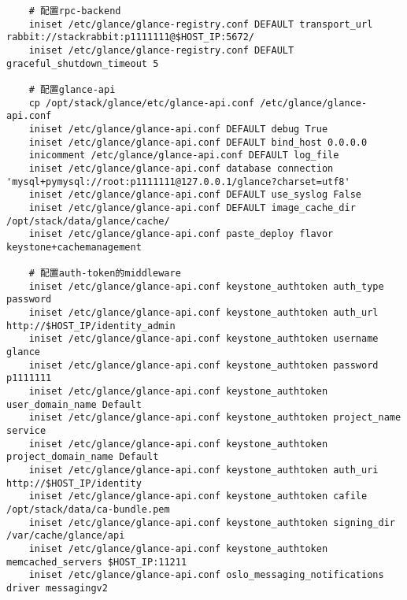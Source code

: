 \documentclass[a4paper,left=1.5cm,right=1.5cm,11pt]{article}
\begin{document}
\begin{lstlisting}
	# 配置rpc-backend
	iniset /etc/glance/glance-registry.conf DEFAULT transport_url rabbit://stackrabbit:p1111111@$HOST_IP:5672/
	iniset /etc/glance/glance-registry.conf DEFAULT graceful_shutdown_timeout 5

	# 配置glance-api
    cp /opt/stack/glance/etc/glance-api.conf /etc/glance/glance-api.conf
    iniset /etc/glance/glance-api.conf DEFAULT debug True
    iniset /etc/glance/glance-api.conf DEFAULT bind_host 0.0.0.0
    inicomment /etc/glance/glance-api.conf DEFAULT log_file
    iniset /etc/glance/glance-api.conf database connection 'mysql+pymysql://root:p1111111@127.0.0.1/glance?charset=utf8'
    iniset /etc/glance/glance-api.conf DEFAULT use_syslog False
    iniset /etc/glance/glance-api.conf DEFAULT image_cache_dir /opt/stack/data/glance/cache/
    iniset /etc/glance/glance-api.conf paste_deploy flavor keystone+cachemanagement
	
	# 配置auth-token的middleware
	iniset /etc/glance/glance-api.conf keystone_authtoken auth_type password
    iniset /etc/glance/glance-api.conf keystone_authtoken auth_url http://$HOST_IP/identity_admin
    iniset /etc/glance/glance-api.conf keystone_authtoken username glance
    iniset /etc/glance/glance-api.conf keystone_authtoken password p1111111
    iniset /etc/glance/glance-api.conf keystone_authtoken user_domain_name Default
    iniset /etc/glance/glance-api.conf keystone_authtoken project_name service
    iniset /etc/glance/glance-api.conf keystone_authtoken project_domain_name Default
    iniset /etc/glance/glance-api.conf keystone_authtoken auth_uri http://$HOST_IP/identity
    iniset /etc/glance/glance-api.conf keystone_authtoken cafile /opt/stack/data/ca-bundle.pem
    iniset /etc/glance/glance-api.conf keystone_authtoken signing_dir /var/cache/glance/api
    iniset /etc/glance/glance-api.conf keystone_authtoken memcached_servers $HOST_IP:11211
    iniset /etc/glance/glance-api.conf oslo_messaging_notifications driver messagingv2
	

\end{lstlisting}
\end{document}
